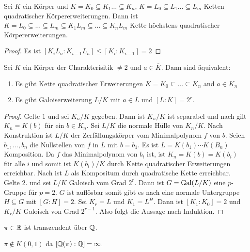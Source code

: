 \begin{Lemma}\label{Lem:KompQuad}
    Sei \(K\) ein Körper und \(K=K_0\subseteq K_1\dots\subseteq K_n\), \(K=L_0\subseteq L_1\dots\subseteq L_m\) Ketten quadratischer Körpererweiterungen.
    Dann ist \(K=L_0\subseteq \dots\subseteq L_m\subseteq K_1L_m\subseteq\dots \subseteq K_nL_m\) Kette höchstens quadratischer Körpererweiterungen.
\end{Lemma}
\begin{proof}
    Es ist \([K_iL_n:K_{i-1}L_n]\leq [K_i:K_{i-1}]=2\)
\end{proof}
\begin{Satz}
    Sei \(K\) ein Körper der Charakterisitik \(\neq 2\) und \(a\in\bar K\). Dann sind äquivalent:
    \begin{enumerate}
        \item Es gibt Kette quadratischer Erweiterungen \(K=K_0\subseteq \dots\subseteq K_n\) and \(a\in K_n\)
        \item Es gibt Galoiserweiterung \(L/K\) mit \(a\in L\) und \([L:K]=2^r\).
    \end{enumerate}
\end{Satz}
\begin{proof}
    Gelte \(1\) und sei \(K_n/K\) gegeben. Dann ist \(K_n/K\) ist separabel und nach  gilt \(K_n=K(b)\) für ein \(b\in K_n\). Sei \(L/K\) die normale Hülle von \(K_n/K\). Nach Konstruktion ist \(L/K\) der Zerfällungskörper vom Minimalpolynom \(f\) von \(b\). Seien \(b_1,\dots,b_n\) die Nullstellen von \(f\) in \(L\) mit \(b=b_1.\) Es ist \(L=K(b_1)\cdots K(B_n)\) Komposition. Da \(f\) das Minimalpolynom von \(b_i\) ist, ist \(K_n=K(b)=K(b_i)\) für alle \(i\) und somit ist \(K(b_i)/K\) durch Kette quadratischer Erweiterungen erreichbar. Nach  ist \(L\) als Kompositum durch quadratische Kette erreichbar. Gelte 2. und sei \(L/K\) Galoisch vom Grad \(2^r\). Dann ist \(G=\operatorname{Gal}(L/K)\) eine \(p\)-Gruppe für \(p=2\).
    \(G\) ist auflösbar somit gibt es nach  eine normale Untergruppe \(H\subseteq G\) mit \([G:H]=2\).
    Sei \(K_r=L\) und \(K_1=L^H\). Dann ist \([K_1:K_0]=2\) und \(K_r/K\) Galoisch von Grad \(2^{r-1}\). Also folgt die Aussage nach Induktion.
\end{proof}
\begin{Satz}
    \(\pi\in\mathbb{R}\) ist transzendent über \(\mathbb{Q}\).
\end{Satz}
\begin{Kor}
    \(\pi\not\in K(0,1)\) da \([\mathbb{Q}(\pi):\mathbb{Q}]=\infty\).
\end{Kor}
